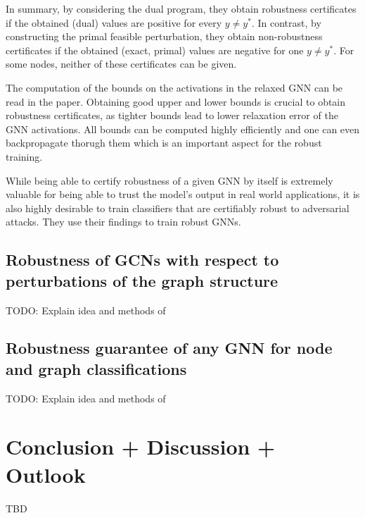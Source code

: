 \documentclass[a4paper,preprint]{sig-alternate}
\begin{document}
In summary, by considering the dual program, they obtain robustness certificates if the obtained (dual) values are positive for every $y \neq y^*$.
In contrast, by constructing the primal feasible perturbation, they obtain non-robustness certificates if the obtained (exact, primal) values
are negative for one $y \neq y^*$. For some nodes, neither of these certificates can be given.

The computation of the bounds on the activations in the relaxed GNN can be read in the paper. Obtaining good upper and lower bounds is crucial
to obtain robustness certificates, as tighter bounds lead to lower relaxation error of the GNN activations. 
All bounds can be computed highly efficiently and one can even backpropagate thorugh them which is an important aspect for the robust training.

While being able to certify robustness of a given GNN by itself is extremely valuable for being able to trust the model's output in real world
applications, it is also highly desirable to train classifiers that are certifiably robust to adversarial attacks.
They use their findings to train robust GNNs.


\vfill
\pagebreak

\subsection{Robustness of GCNs with respect to perturbations of the graph structure}
\label{sec:paper_three}

TODO: Explain idea and methods of \cite{10.1145/3394486.3403217}

\subsection{Robustness guarantee of any GNN for node and graph classifications}
\label{sec:paper_four}

TODO: Explain idea and methods of \cite{wang2020certified}

\section{Conclusion + Discussion + Outlook}
\label{sec:conclusion}
TBD

\vfill
\pagebreak



\end{document}

